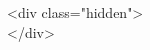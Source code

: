 <div class="hidden">
$$
\newcommand{\setmin}{\mathbin{\backslash}}
\newcommand{\symmdiff}{\bigtriangleup}
$$
</div>